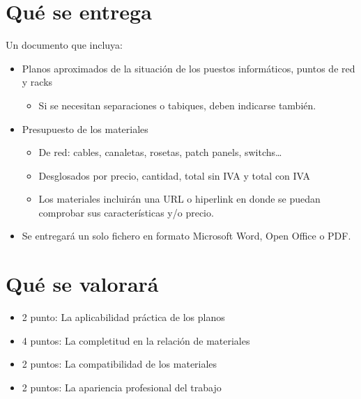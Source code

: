 \documentclass[a4paper]{article}
\begin{document}
\section{Qué se entrega}
\label{sec:org0000006}
Un documento que incluya:
\begin{itemize}
\item Planos aproximados de la situación de los puestos informáticos, puntos de red y racks
\begin{itemize}
\item Si se necesitan separaciones o tabiques, deben indicarse también.
\end{itemize}
\item Presupuesto de los materiales
\begin{itemize}
\item De red: cables, canaletas, rosetas, patch panels, switchs…
\item Desglosados por precio, cantidad, total sin IVA y total con IVA
\item Los materiales incluirán una URL o hiperlink en donde se puedan comprobar sus características y/o precio.
\end{itemize}
\item Se entregará un solo fichero en formato Microsoft Word, Open Office o PDF.
\end{itemize}



\section{Qué se valorará}
\label{sec:org0000009}
\begin{itemize}
\item 2 punto: La aplicabilidad práctica de los planos
\item 4 puntos: La completitud en la relación de materiales
\item 2 puntos: La compatibilidad de los materiales
\item 2 puntos: La apariencia profesional del trabajo
\end{itemize}
\end{document}
